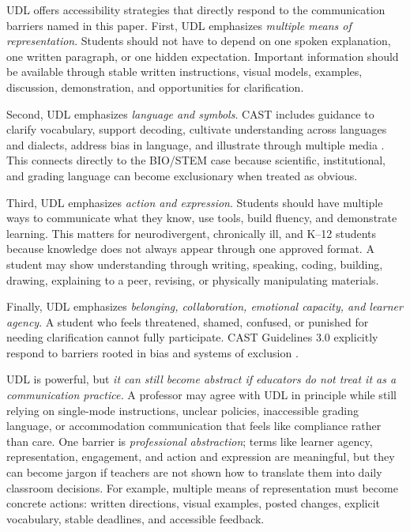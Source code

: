 
UDL offers accessibility strategies that directly respond to the communication barriers named in this paper. First, UDL emphasizes \textit{multiple means of representation}. Students should not have to depend on one spoken explanation, one written paragraph, or one hidden expectation. Important information should be available through stable written instructions, visual models, examples, discussion, demonstration, and opportunities for clarification.

Second, UDL emphasizes \textit{language and symbols}. CAST includes guidance to clarify vocabulary, support decoding, cultivate understanding across languages and dialects, address bias in language, and illustrate through multiple media \citep{cast2024udl}. This connects directly to the BIO/STEM case because scientific, institutional, and grading language can become exclusionary when treated as obvious.

Third, UDL emphasizes \textit{action and expression}. Students should have multiple ways to communicate what they know, use tools, build fluency, and demonstrate learning. This matters for neurodivergent, chronically ill, and K--12 students because knowledge does not always appear through one approved format. A student may show understanding through writing, speaking, coding, building, drawing, explaining to a peer, revising, or physically manipulating materials.

Finally, UDL emphasizes \textit{belonging, collaboration, emotional capacity, and learner agency}. A student who feels threatened, shamed, confused, or punished for needing clarification cannot fully participate. CAST Guidelines 3.0 explicitly respond to barriers rooted in bias and systems of exclusion \citep{cast2024udl}.


UDL is powerful, but \textit{it can still become abstract if educators do not treat it as a communication practice.} A professor may agree with UDL in principle while still relying on single-mode instructions, unclear policies, inaccessible grading language, or accommodation communication that feels like compliance rather than care. One barrier is \textit{professional abstraction}; terms like learner agency, representation, engagement, and action and expression are meaningful, but they can become jargon if teachers are not shown how to translate them into daily classroom decisions. For example, multiple means of representation must become concrete actions: written directions, visual examples, posted changes, explicit vocabulary, stable deadlines, and accessible feedback.

